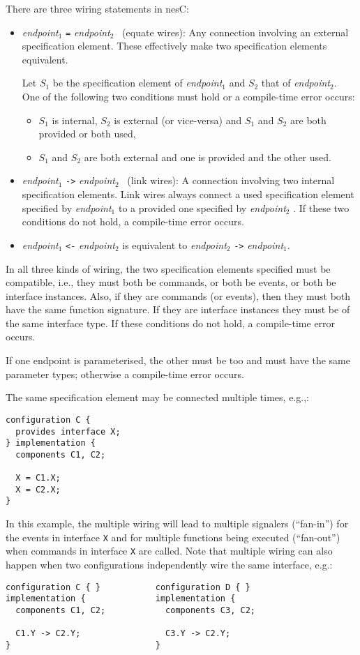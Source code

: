 \documentclass[11pt]{article}
\newcommand{\code}[1]{{\tt #1}}
\newcommand{\nesc}{nesC\xspace}
\begin{document}
There are three wiring statements in \nesc:
\begin{itemize}
\item \emph{endpoint}$_1$ \code{=} \emph{endpoint}$_2$ \ (equate wires):
Any connection involving an external specification element. These
effectively make two specification elements equivalent.

Let $S_1$ be the specification element of \emph{endpoint}$_1$ and $S_2$
that of \emph{endpoint}$_2$. One of the following two conditions must hold
or a compile-time error occurs:
\begin{itemize}
\item $S_1$ is internal, $S_2$ is external (or vice-versa) and $S_1$ and
$S_2$ are both provided or both used,
\item $S_1$ and $S_2$ are both external and one is provided and the other used.
\end{itemize}

\item \emph{endpoint}$_1$ \code{->} \emph{endpoint}$_2$ \ (link wires): A
connection involving two internal specification elements. Link wires always
connect a used specification element specified by \emph{endpoint}$_1$ to a
provided one specified by \emph{endpoint}$_2$ . If these two conditions do
not hold, a compile-time error occurs.

\item \emph{endpoint}$_1$ \code{<-} \emph{endpoint}$_2$ is equivalent to
\emph{endpoint}$_2$ \code{->} \emph{endpoint}$_1$.
\end{itemize}

In all three kinds of wiring, the two specification elements specified must
be compatible, i.e., they must both be commands, or both be events, or both
be interface instances. Also, if they are commands (or events), then they
must both have the same function signature. If they are interface instances
they must be of the same interface type. If these conditions do not hold,
a compile-time error occurs.

If one endpoint is parameterised, the other must be too and must have the
same parameter types; otherwise a compile-time error occurs.

The same specification element may be connected multiple times, e.g.,:
\begin{verbatim}
configuration C {
  provides interface X;
} implementation {
  components C1, C2;

  X = C1.X;
  X = C2.X;
}
\end{verbatim}
In this example, the multiple wiring will lead to multiple signalers
(``fan-in'') for the events in interface \code{X} and for multiple
functions being executed (``fan-out'') when commands in interface \code{X}
are called. Note that multiple wiring can also happen when two
configurations independently wire the same interface, e.g.:
\begin{verbatim}
configuration C { }           configuration D { }
implementation {              implementation {
  components C1, C2;            components C3, C2;

  C1.Y -> C2.Y;                 C3.Y -> C2.Y;
}                             }
\end{verbatim}
\end{document}

